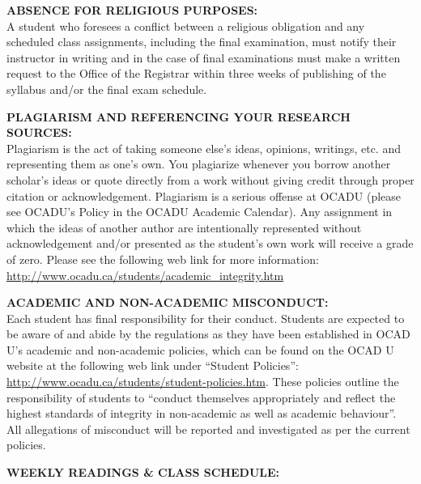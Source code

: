 \documentclass[10pt]{article}
\begin{document}
\textbf{ABSENCE FOR RELIGIOUS PURPOSES:}\\
A student who foresees a conflict between a religious obligation and any scheduled class assignments, including the final examination, must notify their instructor in writing and in the case of final examinations must make a written request to the Office of the Registrar within three weeks of publishing of the syllabus and/or the final exam schedule. 

\textbf{PLAGIARISM AND REFERENCING YOUR RESEARCH SOURCES:}\\
Plagiarism is the act of taking someone else's ideas, opinions, writings, etc. and representing them as one's own. You plagiarize whenever you borrow another scholar's ideas or quote directly from a work without giving credit through proper citation or acknowledgement. Plagiarism is a serious offense at OCADU (please see OCADU's Policy in the OCADU Academic Calendar). Any assignment in which the ideas of another author are intentionally represented without acknowledgement and/or presented as the student's own work will receive a grade of zero. Please see the following web link for more information:
\url{http://www.ocadu.ca/students/academic_integrity.htm}

\textbf{ACADEMIC AND NON-ACADEMIC MISCONDUCT:}\\
Each student has final responsibility for their conduct. Students are expected to be aware of and abide by the regulations as they have been established in OCAD U’s academic and non-academic policies, which can be found on the OCAD U website at the following web link under “Student Policies”: \url{http://www.ocadu.ca/students/student-policies.htm}. These policies outline the responsibility of students to “conduct themselves appropriately and reflect the highest standards of integrity in non-academic as well as academic behaviour”. All allegations of misconduct will be reported and investigated as per the current policies.

\textbf{WEEKLY READINGS \& CLASS SCHEDULE:}\\

\end{document}
